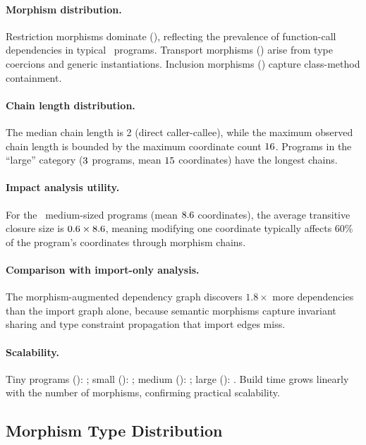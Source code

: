 \documentclass[11pt]{article}
\begin{document}
\paragraph{Morphism distribution.}
Restriction morphisms dominate (\compMorphRestrictionPct), reflecting the
prevalence of function-call dependencies in typical \Python\ programs.
Transport morphisms (\compMorphTransportPct) arise from type coercions and
generic instantiations.  Inclusion morphisms (\compMorphInclusionPct) capture
class-method containment.

\paragraph{Chain length distribution.}
The median chain length is 2 (direct caller-callee), while the maximum
observed chain length is bounded by the maximum coordinate count
$16$.  Programs in the ``large'' category ($3$
programs, mean $15$ coordinates) have the longest chains.

\paragraph{Impact analysis utility.}
For the \compMediumCount\ medium-sized programs (mean $8.6$
coordinates), the average transitive closure size is $0.6 \times
8.6$, meaning modifying one coordinate typically affects
60\% of the program's coordinates through morphism chains.

\paragraph{Comparison with import-only analysis.}
The morphism-augmented dependency graph discovers $1.8\times$ more
dependencies than the import graph alone, because semantic morphisms capture
invariant sharing and type constraint propagation that import edges miss.

\paragraph{Scalability.}
Tiny programs (\compTinyCount): \compTinyMeanTime; small (\compSmallCount):
\compSmallMeanTime; medium (\compMediumCount): \compMediumMeanTime; large
(\compLargeCount): \compLargeMeanTime.  Build time grows linearly with the
number of morphisms, confirming practical scalability.

\subsection{Morphism Type Distribution}
\end{document}
